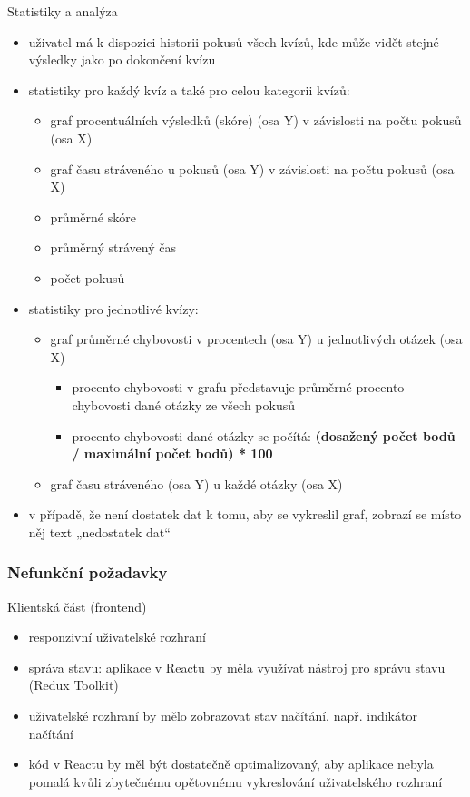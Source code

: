 \documentclass{vskpou} %
\begin{document}
Statistiky a analýza
\begin{itemize}
    \item uživatel má k dispozici historii pokusů všech kvízů, kde může vidět stejné výsledky jako po dokončení kvízu
    \item statistiky pro každý kvíz a také pro celou kategorii kvízů:
    \begin{itemize}
        \item graf procentuálních výsledků (skóre) (osa Y) v závislosti na počtu pokusů (osa X)
        \item graf času stráveného u pokusů (osa Y) v závislosti na počtu pokusů (osa X)
        \item průměrné skóre
        \item průměrný strávený čas
        \item počet pokusů
    \end{itemize}
    \item statistiky pro jednotlivé kvízy:
    \begin{itemize}
        \item graf průměrné chybovosti v procentech (osa Y) u jednotlivých otázek (osa X)
        \begin{itemize}
            \item procento chybovosti v grafu představuje průměrné procento chybovosti dané otázky ze všech pokusů
            \item procento chybovosti dané otázky se počítá: \textbf{(dosažený počet bodů / maximální počet bodů) * 100}
        \end{itemize}
        \item graf času stráveného (osa Y) u každé otázky (osa X)
    \end{itemize}
    \item v případě, že není dostatek dat k tomu, aby se vykreslil graf, zobrazí se místo něj text „nedostatek dat“
\end{itemize}

\subsubsection*{Nefunkční požadavky}

Klientská část (frontend)
\begin{itemize}
    \item responzivní uživatelské rozhraní
    \item správa stavu: aplikace v Reactu by měla využívat nástroj pro správu stavu (Redux Toolkit)
    \item uživatelské rozhraní by mělo zobrazovat stav načítání, např. indikátor načítání
    \item kód v Reactu by měl být dostatečně optimalizovaný, aby aplikace nebyla pomalá kvůli zbytečnému opětovnému vykreslování uživatelského rozhraní
\end{itemize}
\end{document}

